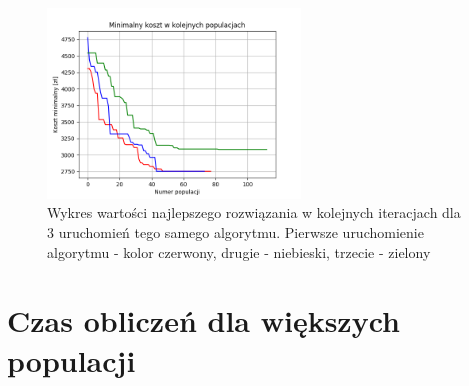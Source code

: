 \documentclass[12pt, oneside, final]{report}
\begin{document}
\begin{figure}[ht!]
\centering
\includegraphics[width=0.6\textwidth]{graphics/disconnect}
\caption{Wykres wartości najlepszego rozwiązania w kolejnych iteracjach dla 3 uruchomień tego samego algorytmu. Pierwsze uruchomienie algorytmu - kolor czerwony, drugie - niebieski, trzecie - zielony}
\label{fig:disconnect}
\end{figure}

\section{Czas obliczeń dla większych populacji}
 
\end{document}
